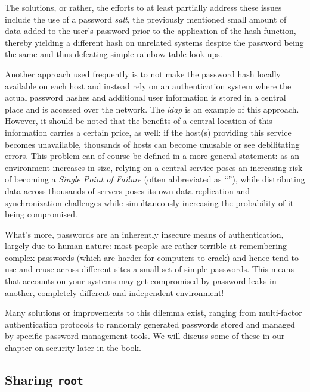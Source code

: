 The solutions, or rather, the efforts to at least
partially address these issues include the use of a
password {\em salt}, the previously
mentioned small amount of data added to the user's
password prior to the application of the hash
function, thereby yielding a different hash on
unrelated systems despite the password being the same
and thus defeating simple rainbow table look ups.

Another approach used frequently is to not make the
password hash locally available on each host and
instead rely on an authentication system where the
actual password hashes and additional user
information is stored in a central place and is
accessed over the network.  The {\em
\gls{ldap}} is an example of this
approach.  However, it should be noted that the
benefits of a central location of this information
carries a certain price, as well: if the host(s)
providing this service becomes unavailable, thousands
of hosts can become unusable or see debilitating
errors.  This problem can of course be defined in a
more general statement: as an environment increases in
size, relying on a central service poses an increasing
risk of becoming a {\em Single Point of
Failure} (often
abbreviated as ``''), while
distributing data across thousands of servers poses
its own data replication and synchronization
challenges while simultaneously increasing the
probability of it being compromised.

What's more, passwords are an inherently insecure
means of authentication, largely due to human nature:
most people are rather terrible at remembering complex
passwords (which are harder for computers to crack)
and hence tend to use and reuse across different sites
a small set of simple passwords.  This means that
accounts on your systems may get compromised by
password leaks in another, completely different and
independent environment!

Many solutions or improvements to this dilemma exist,
ranging from multi-factor authentication protocols to
randomly generated passwords stored and managed by
specific password management tools.  We will discuss
some of these in our chapter on security later in the
book.

\subsection{Sharing {\tt root}}
\label{multi-user:authentication:shared-root}

